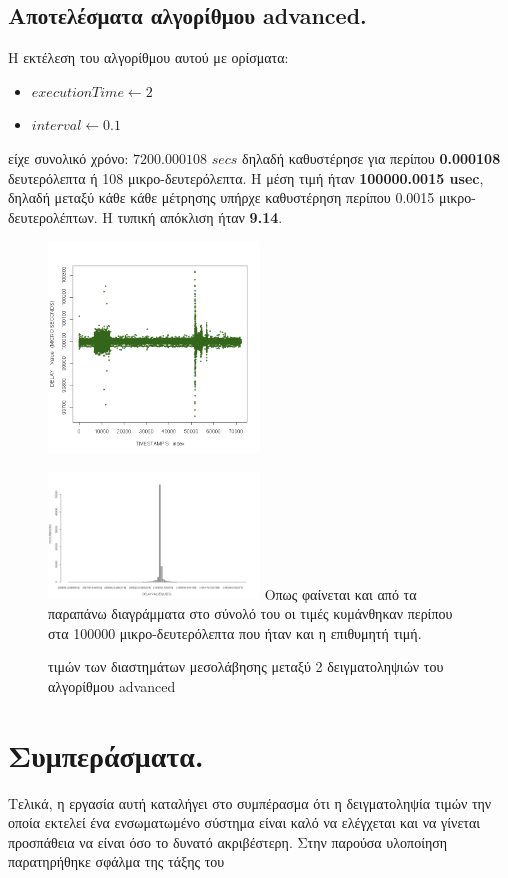 \documentclass[12pt, a4paper]{article}
\begin{document}
\subsection{Αποτελέσματα αλγορίθμου \textlatin{advanced}.}
\justify
Η εκτέλεση του αλγορίθμου αυτού με ορίσματα:
\begin{itemize}
    \item $executionTime \longleftarrow 2$
    \item $interval \longleftarrow 0.1$
\end{itemize}
είχε συνολικό χρόνο: $7200.000108$ $secs$ δηλαδή καθυστέρησε για περίπου \textbf{0.000108} δευτερόλεπτα ή 108 μικρο-δευτερόλεπτα. Η μέση τιμή ήταν \textbf{100000.0015 \textlatin{usec}}, δηλαδή μεταξύ κάθε κάθε μέτρησης υπήρχε καθυστέρηση περίπου 0.0015 μικρο-δευτερολέπτων. Η τυπική απόκλιση ήταν \textbf{9.14}.
\begin{figure}[h]
\caption{}
\centering
\includegraphics[width=0.5\textwidth]{images/advanced.png}
\end{figure}

\begin{figure}[h]
 \caption{ τιμών των διαστημάτων μεσολάβησης μεταξύ 2 δειγματοληψιών του αλγορίθμου \textlatin{advanced}}
\centering
\includegraphics[width=0.5\textwidth]{images/advanced_distribution.png}
\justify
Οπως φαίνεται και από τα παραπάνω διαγράμματα στο σύνολό του οι τιμές κυμάνθηκαν περίπου στα 100000 μικρο-δευτερόλεπτα που ήταν και η επιθυμητή τιμή.
\end{figure}

\newpage

\section{Συμπεράσματα.}
Τελικά, η εργασία αυτή καταλήγει στο συμπέρασμα ότι η δειγματοληψία τιμών την οποία εκτελεί ένα ενσωματωμένο σύστημα είναι καλό να ελέγχεται και να γίνεται προσπάθεια να είναι όσο το δυνατό ακριβέστερη. Στην παρούσα υλοποίηση παρατηρήθηκε σφάλμα της τάξης του 


\end{document}
